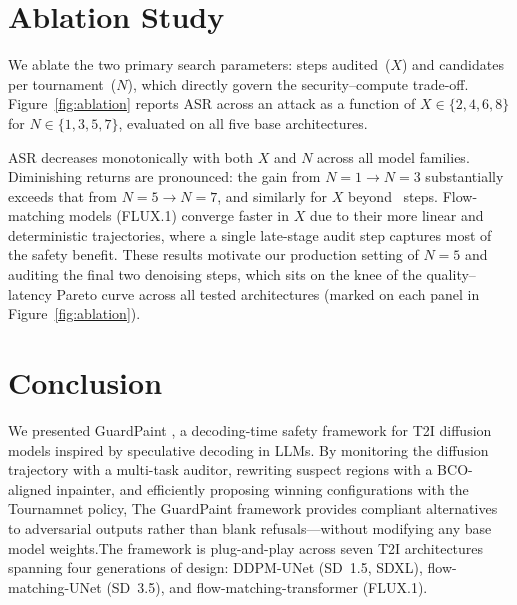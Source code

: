 \documentclass[11pt]{article}
\begin{document}
\section{Ablation Study}
\label{sec:analysis}
We ablate the two primary search parameters: steps audited~($X$) 
and candidates per tournament~($N$), which directly govern the 
security--compute trade-off.
Figure~\ref{fig:ablation} reports ASR across an attack  as a function of $X \in \{2,4,6,8\}$ for 
$N \in \{1,3,5,7\}$, evaluated on all five base architectures.

ASR decreases monotonically with both $X$ and $N$ across all 
model families.
Diminishing returns are pronounced: the gain from 
$N\!=\!1 \to N\!=\!3$ substantially exceeds that from 
$N\!=\!5 \to N\!=\!7$, and similarly for $X$ beyond~ steps.
Flow-matching models (FLUX.1) converge faster in $X$ due to 
their more linear and deterministic trajectories, where a 
single late-stage audit step captures most of the safety benefit.
These results motivate our production setting of $N\!=\!5$ and 
auditing the final two denoising steps, which sits on the knee 
of the quality--latency Pareto curve across all tested 
architectures (marked on each panel in Figure~\ref{fig:ablation}).

\section{Conclusion}
\label{sec:conclusion}
 
We presented GuardPaint , a decoding-time safety framework for T2I diffusion models inspired by speculative decoding in LLMs.
By monitoring the diffusion trajectory with a multi-task auditor, rewriting suspect regions with a BCO-aligned inpainter, and efficiently proposing winning configurations with the Tournamnet policy, The GuardPaint framework provides compliant alternatives to adversarial outputs rather than blank refusals---without modifying any base model weights.The framework is plug-and-play across seven T2I architectures spanning four generations of design: DDPM-UNet (SD~1.5, SDXL), flow-matching-UNet (SD~3.5), and flow-matching-transformer (FLUX.1).


\clearpage
\newpage
\end{document}
